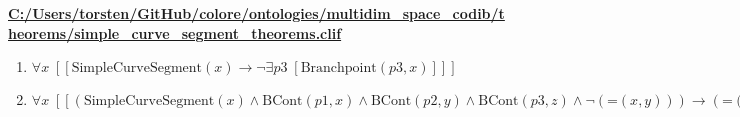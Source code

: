 \documentclass{article}
\begin{document}
\textbf{\url{C:/Users/torsten/GitHub/colore/ontologies/multidim\_space\_codib/theorems/simple\_curve\_segment\_theorems.clif}}

\begin{enumerate}
\item $\forall x\;  \left[ \left[ \textrm{SimpleCurveSegment}(x) \rightarrow \neg \exists p3\;  \left[ \textrm{Branchpoint}(p3,x) \right] \right] \right]$
\item $\forall x\;  \left[ \left[ \left(\textrm{SimpleCurveSegment}(x) \land \textrm{BCont}(p1,x) \land \textrm{BCont}(p2,y) \land \textrm{BCont}(p3,z) \land \neg \left(\textrm{=}(x,y)\right)\right) \rightarrow \left(\textrm{=}(p1,p3) \lor \textrm{=}(p2,p3)\right) \right] \right]$
\end{enumerate}
\end{document}
